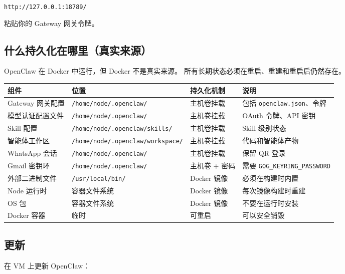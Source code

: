 \texttt{http://127.0.0.1:18789/}

粘贴你的 Gateway 网关令牌。

\hrulefill


\subsection{什么持久化在哪里（真实来源）}


OpenClaw 在 Docker 中运行，但 Docker 不是真实来源。
所有长期状态必须在重启、重建和重启后仍然存在。


\begin{table}[h]
\centering
\small
\begin{tabular}{|l|l|l|l|}
\hline
组件 & 位置 & 持久化机制 & 说明 \\
\hline
Gateway 网关配置 & \texttt{/home/node/.openclaw/} & 主机卷挂载 & 包括 \texttt{openclaw.json}、令牌 \\
\hline
模型认证配置文件 & \texttt{/home/node/.openclaw/} & 主机卷挂载 & OAuth 令牌、API 密钥 \\
\hline
Skill 配置 & \texttt{/home/node/.openclaw/skills/} & 主机卷挂载 & Skill 级别状态 \\
\hline
智能体工作区 & \texttt{/home/node/.openclaw/workspace/} & 主机卷挂载 & 代码和智能体产物 \\
\hline
WhatsApp 会话 & \texttt{/home/node/.openclaw/} & 主机卷挂载 & 保留 QR 登录 \\
\hline
Gmail 密钥环 & \texttt{/home/node/.openclaw/} & 主机卷 + 密码 & 需要 \texttt{GOG\_KEYRING\_PASSWORD} \\
\hline
外部二进制文件 & \texttt{/usr/local/bin/} & Docker 镜像 & 必须在构建时内置 \\
\hline
Node 运行时 & 容器文件系统 & Docker 镜像 & 每次镜像构建时重建 \\
\hline
OS 包 & 容器文件系统 & Docker 镜像 & 不要在运行时安装 \\
\hline
Docker 容器 & 临时 & 可重启 & 可以安全销毁 \\
\hline
\end{tabular}
\end{table}



\hrulefill


\subsection{更新}


在 VM 上更新 OpenClaw：

